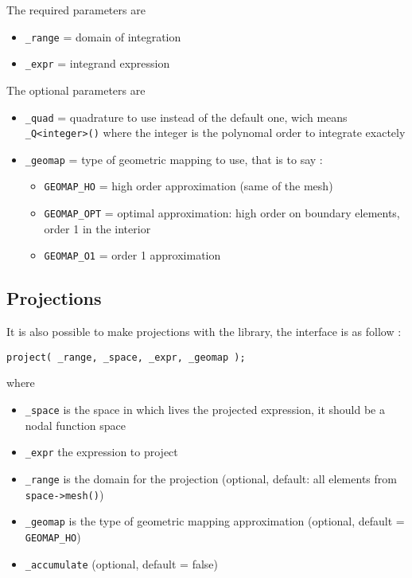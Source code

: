 \noindent The required parameters are
\begin{itemize}
 \item \lstinline!_range!  = domain of integration
 \item \lstinline!_expr!  = integrand expression
\end{itemize}
The optional parameters are
\begin{itemize}
 \item \lstinline!_quad!  = quadrature to use instead of the default one, wich means \lstinline!_Q<integer>()! where the integer is the polynomal order to integrate exactely
 \item \lstinline!_geomap!  = type of geometric mapping to use, that is to say :
	\begin{itemize}
  	\item \lstinline!GEOMAP_HO!  =  high order approximation (same of the mesh)
  	\item \lstinline!GEOMAP_OPT!  = optimal approximation: high order on boundary elements, order 1 in the interior
  	\item \lstinline!GEOMAP_O1!  = order 1 approximation
	\end{itemize}
\end{itemize}


\subsection{Projections}
\label{keywords:projections}
It is also possible to make projections with the library, the interface is as follow :
\begin{lstlisting}
project( _range, _space, _expr, _geomap );
\end{lstlisting}
where
\begin{itemize}
 \item \lstinline!_space!  is the space in which lives the projected expression, it should be a nodal function space
  \item \lstinline!_expr!  the expression to project
  \item \lstinline!_range!  is the domain for the projection (optional, default: all elements from \lstinline!space->mesh()!) 
  \item \lstinline!_geomap!  is the type of geometric mapping approximation (optional, default = \lstinline!GEOMAP_HO!)
  \item \lstinline!_accumulate!  (optional, default = false)
\end{itemize}


